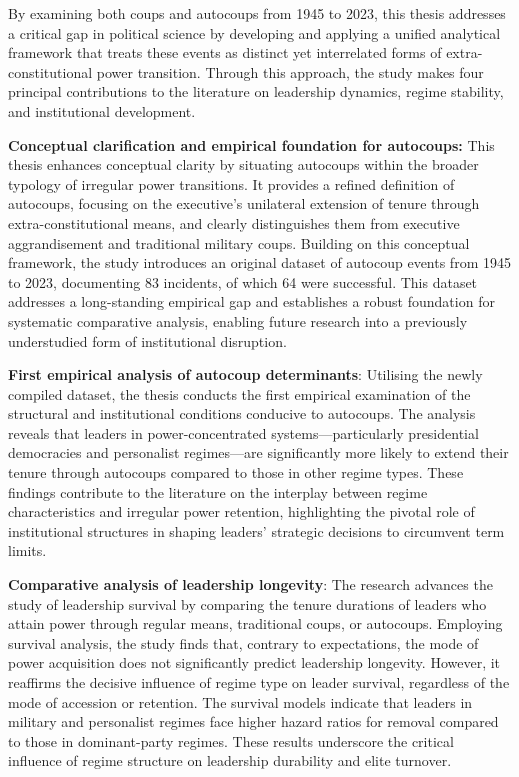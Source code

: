 \documentclass[
  12pt,
]{report}
\begin{document}
By examining both coups and autocoups from 1945 to 2023, this thesis
addresses a critical gap in political science by developing and applying
a unified analytical framework that treats these events as distinct yet
interrelated forms of extra-constitutional power transition. Through
this approach, the study makes four principal contributions to the
literature on leadership dynamics, regime stability, and institutional
development.

\textbf{Conceptual clarification and empirical foundation for
autocoups:} This thesis enhances conceptual clarity by situating
autocoups within the broader typology of irregular power transitions. It
provides a refined definition of autocoups, focusing on the executive's
unilateral extension of tenure through extra-constitutional means, and
clearly distinguishes them from executive aggrandisement and traditional
military coups. Building on this conceptual framework, the study
introduces an original dataset of autocoup events from 1945 to 2023,
documenting 83 incidents, of which 64 were successful. This dataset
addresses a long-standing empirical gap and establishes a robust
foundation for systematic comparative analysis, enabling future research
into a previously understudied form of institutional disruption.

\textbf{First empirical analysis of autocoup determinants}: Utilising
the newly compiled dataset, the thesis conducts the first empirical
examination of the structural and institutional conditions conducive to
autocoups. The analysis reveals that leaders in power-concentrated
systems---particularly presidential democracies and personalist
regimes---are significantly more likely to extend their tenure through
autocoups compared to those in other regime types. These findings
contribute to the literature on the interplay between regime
characteristics and irregular power retention, highlighting the pivotal
role of institutional structures in shaping leaders' strategic decisions
to circumvent term limits.

\textbf{Comparative analysis of leadership longevity}: The research
advances the study of leadership survival by comparing the tenure
durations of leaders who attain power through regular means, traditional
coups, or autocoups. Employing survival analysis, the study finds that,
contrary to expectations, the mode of power acquisition does not
significantly predict leadership longevity. However, it reaffirms the
decisive influence of regime type on leader survival, regardless of the
mode of accession or retention. The survival models indicate that
leaders in military and personalist regimes face higher hazard ratios
for removal compared to those in dominant-party regimes. These results
underscore the critical influence of regime structure on leadership
durability and elite turnover.
\end{document}
